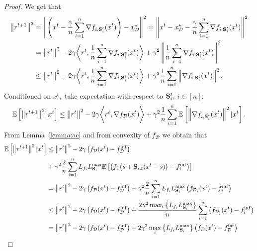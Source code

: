 \documentclass{article}
\newcommand{\bb}{\mathbb}
\newcommand{\cD}{\mathcal{D}}
\newcommand{\Exp}[1]{{\bb E}\left[#1\right]}
\theoremstyle{plain}
\newcommand{\tf}{f_{\mathcal{D}}}
\newcommand{\mS}{{\bf S}}
\theoremstyle{plain}
\theoremstyle{definition}
\theoremstyle{remark}
\begin{document}
\begin{proof}
	We get that
	\begin{equation*}
		\begin{split}
			\left\|r^{t+1}\right\|^2 & = \left\|\left(x^t-\frac{\gamma}{n}\sum_{i=1}^{n}\nabla f_{i,\mS_i^{t}}(x^t) \right) - x_\cD^\star\right\|^2  = \left\|x^t-x_\cD^\star - \frac{\gamma}{n}\sum_{i=1}^{n}\nabla f_{i,\mS_i^{t}}(x^t)\right\|^2 \\
			& = \left\|r^{t}\right\|^2 - 2\gamma\bigg{<}r^t, \frac{1}{n}\sum_{i=1}^{n}\nabla f_{i,\mS_i^{t}}(x^t)\bigg{>} + \gamma^2\left\|\frac{1}{n}\sum_{i=1}^{n}\nabla f_{i,\mS_i^{t}}(x^t)\right\|^2\\
			& \leq \left\|r^{t}\right\|^2 - 2\gamma\bigg{<}r^t, \frac{1}{n}\sum_{i=1}^{n}\nabla f_{i,\mS_i^{t}}(x^t)\bigg{>} + \gamma^2\frac{1}{n}\sum_{i=1}^{n}\left\|\nabla f_{i,\mS_i^{t}}(x^t)\right\|^2.\\
		\end{split}
	\end{equation*}
	Conditioned on $x^t,$ take expectation with respect to $\mS^{t}_i,$ $i\in[n]:$
	\begin{equation*}
		\begin{split}
			\Exp{\left\|r^{t+1}\right\|^2|x^t} & \leq \left\|r^{t}\right\|^2 - 2\gamma\bigg{<}r^t, \nabla \tf(x^t)\bigg{>} + \gamma^2\frac{1}{n}\sum_{i=1}^{n}\Exp{\left\|\nabla f_{i,\mS_i^{t}}(x^t)\right\|^2|x^t}.\\
		\end{split}
	\end{equation*}
	From Lemma~\ref{lemma:ac} and from convexity of $\tf$ we obtain that
	\begin{equation*}
		\begin{split}
			\Exp{\left\|r^{t+1}\right\|^2|x^t} & \leq \left\|r^{t}\right\|^2 - 2\gamma\left( \tf(x^t) - \tf^{\inf}\right)\\ & + \gamma^2\frac{2}{n}\sum_{i=1}^{n}L_{f_i}L_{\mS_i}^{\max} \Exp{\left(f_i\left(s+\mS_{i,t}(x^t-s)\right) - f_i^{\inf}\right)}\\
			& = \left\|r^{t}\right\|^2 - 2\gamma\left( \tf(x^t) - \tf^{\inf}\right) + \gamma^2\frac{2}{n}\sum_{i=1}^{n}L_{f_i}L_{\mS_i}^{\max}\left(f_{\mathcal{D_i}}(x^t)-f_i^{\inf}\right)\\
			& \leq \left\|r^{t}\right\|^2 - 2\gamma\left( \tf(x^t) - \tf^{\inf}\right) + \frac{2\gamma^2\max_i\left\lbrace L_{f_i}L_{\mS_i}^{\max} \right\rbrace }{n}\sum_{i=1}^{n}\left(f_{\mathcal{D_i}}(x^t)-f_i^{\inf}\right)\\
			& = \left\|r^{t}\right\|^2 - 2\gamma\left( \tf(x^t) - \tf^{\inf}\right) + 2\gamma^2\max_i\left\lbrace L_{f_i}L_{\mS_i}^{\max} \right\rbrace\left(\tf(x^t) - \tf^{\inf}\right)\\

\end{split}
\end{equation*}
\end{proof}
\end{document}
